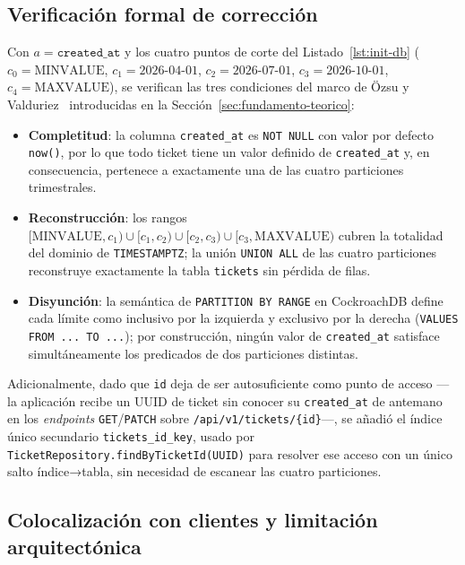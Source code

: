 \subsection{Verificación formal de corrección}

Con $a = \texttt{created\_at}$ y los cuatro puntos de corte del Listado~\ref{lst:init-db}
($c_0 = \text{MINVALUE}$, $c_1 = \text{2026-04-01}$, $c_2 = \text{2026-07-01}$,
$c_3 = \text{2026-10-01}$, $c_4 = \text{MAXVALUE}$), se verifican las tres condiciones del
marco de Özsu y Valduriez~\cite{ozsu2011principles} introducidas en la
Sección~\ref{sec:fundamento-teorico}:

\begin{itemize}[leftmargin=1.5em]
    \item \textbf{Completitud}: la columna \texttt{created\_at} es \texttt{NOT NULL} con valor
        por defecto \texttt{now()}, por lo que todo ticket tiene un valor definido de
        \texttt{created\_at} y, en consecuencia, pertenece a exactamente una de las cuatro
        particiones trimestrales.
    \item \textbf{Reconstrucción}: los rangos
        $[\text{MINVALUE}, c_1) \cup [c_1, c_2) \cup [c_2, c_3) \cup [c_3, \text{MAXVALUE})$
        cubren la totalidad del dominio de \texttt{TIMESTAMPTZ}; la unión \texttt{UNION ALL} de
        las cuatro particiones reconstruye exactamente la tabla \texttt{tickets} sin pérdida de
        filas.
    \item \textbf{Disyunción}: la semántica de \texttt{PARTITION BY RANGE} en CockroachDB define
        cada límite como inclusivo por la izquierda y exclusivo por la derecha
        (\texttt{VALUES FROM ... TO ...}); por construcción, ningún valor de \texttt{created\_at}
        satisface simultáneamente los predicados de dos particiones distintas.
\end{itemize}

Adicionalmente, dado que \texttt{id} deja de ser autosuficiente como punto de acceso —la
aplicación recibe un UUID de ticket sin conocer su \texttt{created\_at} de antemano en los
\emph{endpoints} \texttt{GET}/\texttt{PATCH} sobre \texttt{/api/v1/tickets/\{id\}}—, se añadió el índice único secundario
\texttt{tickets\_id\_key}, usado por \texttt{TicketRepository.findByTicketId(UUID)} para resolver
ese acceso con un único salto índice→tabla, sin necesidad de escanear las cuatro particiones.

\subsection{Colocalización con clientes y limitación arquitectónica}

